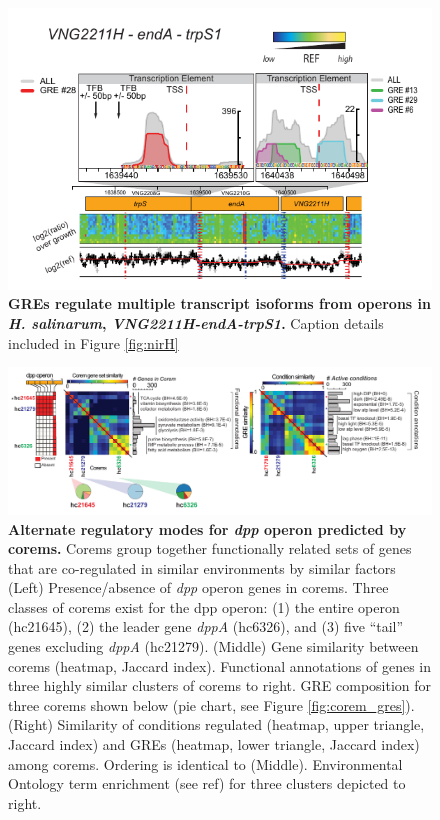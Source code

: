 \begin{figure}[hp]
\centering
\includegraphics[width=0.95\linewidth]{figures/vng2211h.pdf}
\caption[GREs regulate multiple transcript isoforms from operons in {\it H. salinarum}, \textit{VNG2211H-endA-trpS1}.]{\textbf{GREs regulate multiple transcript isoforms from operons in {\it H. salinarum}, \textit{VNG2211H-endA-trpS1}.} Caption details included in Figure \ref{fig:nirH}}
\label{fig:vng2211h}
\end{figure}

\begin{figure}[hp]
\centering
\includegraphics[width=0.95\linewidth]{figures/dpp_heatmaps.pdf}
\caption[Alternate regulatory modes for \textit{dpp} operon predicted by corems]{\textbf{Alternate regulatory modes for \textit{dpp} operon predicted by corems.} Corems group together functionally related sets of genes that are co-regulated in similar environments by similar factors (Left) Presence/absence of \textit{dpp} operon genes in corems. Three classes of corems exist for the dpp operon: (1) the entire operon (\eg hc21645), (2) the leader gene \textit{dppA} (\eg hc6326), and (3) five ``tail'' genes excluding \textit{dppA} (hc21279). (Middle) Gene similarity between corems (heatmap, Jaccard index). Functional annotations of genes in three highly similar clusters of corems to right. GRE composition for three corems shown below (pie chart, see Figure \ref{fig:corem_gres}). (Right) Similarity of conditions regulated (heatmap, upper triangle, Jaccard index) and GREs (heatmap, lower triangle, Jaccard index) among corems. Ordering is identical to (Middle). Environmental Ontology term enrichment (see ref{}) for three clusters depicted to right.}
\label{fig:dpp_heatmaps}
\end{figure}

